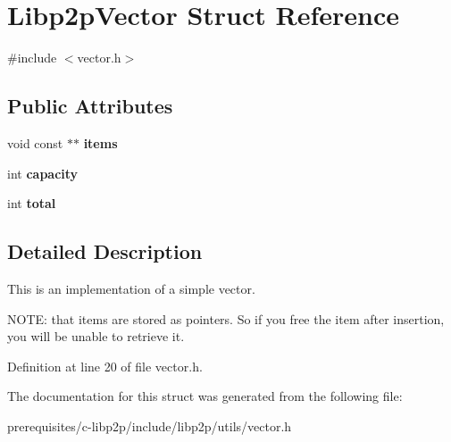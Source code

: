 \hypertarget{struct_libp2p_vector}{}\section{Libp2p\+Vector Struct Reference}
\label{struct_libp2p_vector}


{\ttfamily \#include $<$vector.\+h$>$}

\subsection*{Public Attributes}
\begin{DoxyCompactItemize}
\item 
\mbox{\label{struct_libp2p_vector_a11c4974536ca0b35c9d7b64d8b80d918}} 
void const  $\ast$$\ast$ {\bfseries items}
\item 
\mbox{\label{struct_libp2p_vector_ac63997f6247454cf762c7e6618d537a5}} 
int {\bfseries capacity}
\item 
\mbox{\label{struct_libp2p_vector_a36a176701455c099d0637a0041b43aa2}} 
int {\bfseries total}
\end{DoxyCompactItemize}


\subsection{Detailed Description}
This is an implementation of a simple vector.

N\+O\+TE\+: that items are stored as pointers. So if you free the item after insertion, you will be unable to retrieve it. 

Definition at line 20 of file vector.\+h.



The documentation for this struct was generated from the following file\+:\begin{DoxyCompactItemize}
\item 
prerequisites/c-\/libp2p/include/libp2p/utils/vector.\+h\end{DoxyCompactItemize}
